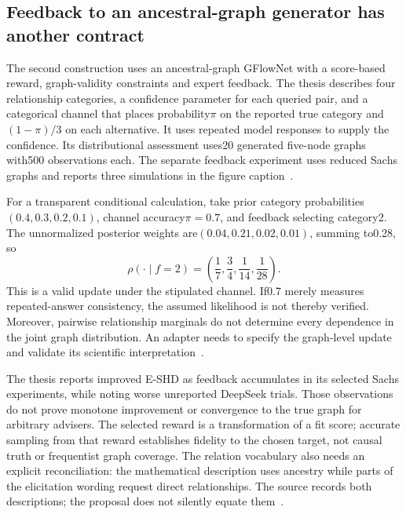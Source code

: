 \subsection{Feedback to an ancestral-graph generator has another contract}
The second construction uses an ancestral-graph GFlowNet with a score-based reward, graph-validity constraints and expert feedback. The thesis describes four relationship categories, a confidence parameter for each queried pair, and a categorical channel that places probability$\pi$ on the reported true category and$(1-\pi)/3$ on each alternative. It uses repeated model responses to supply the confidence. Its distributional assessment uses20 generated five-node graphs with500 observations each. The separate feedback experiment uses reduced Sachs graphs and reports three simulations in the figure caption~\citep{exec18_videira_thesis}.

For a transparent conditional calculation, take prior category probabilities$(0.4,0.3,0.2,0.1)$, channel accuracy$\pi=0.7$, and feedback selecting category2. The unnormalized posterior weights are$(0.04,0.21,0.02,0.01)$, summing to0.28, so
\begin{equation}
 \rho(\cdot\mid f=2)=\left(\frac17,\frac34,\frac1{14},\frac1{28}\right).
 \label{exec18:feedback-update}
\end{equation}
This is a valid update under the stipulated channel. If0.7 merely measures repeated-answer consistency, the assumed likelihood is not thereby verified. Moreover, pairwise relationship marginals do not determine every dependence in the joint graph distribution. An adapter needs to specify the graph-level update and validate its scientific interpretation~\citep{exec18_bayesian_reference}.

The thesis reports improved E-SHD as feedback accumulates in its selected Sachs experiments, while noting worse unreported DeepSeek trials. Those observations do not prove monotone improvement or convergence to the true graph for arbitrary advisers. The selected reward is a transformation of a fit score; accurate sampling from that reward establishes fidelity to the chosen target, not causal truth or frequentist graph coverage. The relation vocabulary also needs an explicit reconciliation: the mathematical description uses ancestry while parts of the elicitation wording request direct relationships. The source records both descriptions; the proposal does not silently equate them~\citep{exec18_videira_thesis}.

